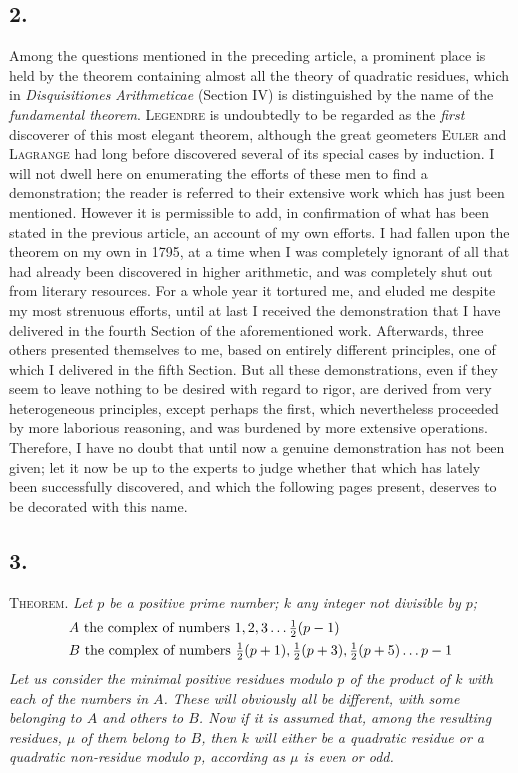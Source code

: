 \documentclass[twoside,12pt]{memoir}
\let\oldfrac\frac
\def\frac#1#2{\mathchoice{\tfrac{#1}{#2}}{\oldfrac{#1}{#2}}{\genfrac{}{}{}{2}{#1}{#2\mathstrut}}{\genfrac{}{}{}{3}{#1}{#2\mathstrut}}}
\begin{document}
\subsection*{2.}

Among the questions mentioned in the preceding article, a prominent place is held by the theorem containing almost all the theory of quadratic residues, which in  \textit{Disquisitiones Arithmeticae} (Section IV) is distinguished by the name of the \textit{fundamental theorem}. \clearpage\noindent%
\textsc{Legendre} is undoubtedly to be regarded as the \textit{first} discoverer of this most elegant theorem, although the great geometers \textsc{Euler} and \textsc{Lagrange} had long before discovered several of its special cases by induction.   I will not dwell here on enumerating the efforts of these men to find a demonstration; the reader is referred to their extensive work which has just been mentioned.  However it is permissible to add, in confirmation of what has been stated in the previous article, an account of my own efforts.   I had fallen upon the theorem on my own in 1795, at a time when I was completely ignorant of all that had already been discovered in higher arithmetic, and was completely shut out from literary resources.  For a whole year it tortured me, and eluded me despite my most strenuous efforts, until at last I received the demonstration that I have delivered in the fourth Section of the aforementioned work.  Afterwards, three others presented themselves to me, based on entirely different principles, one of which I delivered in the fifth Section.  But all these demonstrations, even if they seem to leave nothing to be desired with regard to rigor, are derived from very heterogeneous principles, except perhaps the first, which nevertheless proceeded by more laborious reasoning, and was burdened by more extensive operations.  Therefore, I have no doubt that until now a genuine demonstration has not been given;  let it now be up to the experts to judge whether that which has lately been successfully discovered, and which the following pages present, deserves to be decorated with this name.

\subsection*{3.}

\textsc{Theorem.} \textit{Let \(p\) be a positive prime number; \(k\) any integer not divisible by \(p\);
\[\begin{aligned}
&A \text{ the complex of numbers }1,2,3 \ldots \frac{1}{2}(p-1)\\
&B \text{ the complex of numbers } \frac{1}{2}(p+1), \frac{1}{2}(p+3), \frac{1}{2}(p+5) \ldots p-1
\end{aligned}\]
Let us consider the minimal positive residues modulo \(p\) of the product of \(k\) with each of the numbers in \(A\).  These will obviously all be different, with some belonging to \(A\) and others to \(B\). Now if it is assumed that, among the resulting residues, \(\mu\) of them belong to \(B\), then \(k\) will either be a quadratic residue or a quadratic non-residue modulo \(p\), according as \(\mu\) is even or odd.}
\end{document}
